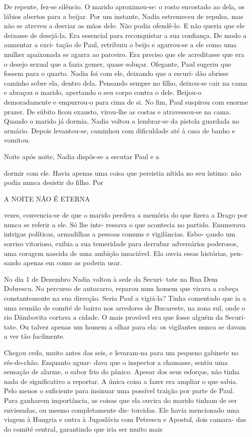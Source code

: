 De repente, fez‑se silêncio. O marido aproximou‑se: o rosto encostado ao
dela, os lábios abertos para a beijar. Por um instante, Nadia estremeceu
de repulsa, mas não se atreveu a desviar as mãos dele. Não podia
ofendê‑lo. E não queria que ele deixasse de desejá‑la. Era essencial
para reconquistar a sua confiança. De modo a aumentar a exci‑ tação de
Paul, retribuiu o beijo e agarrou‑se a ele como uma mulher apaixonada se
agarra ao parceiro. Era preciso que ele acreditasse que era o desejo
sexual que a fazia gemer, quase soluçar. Ofegante, Paul sugeriu que
fossem para o quarto. Nadia foi com ele, deixando que a escuri‑ dão
abrisse caminho sobre ela, dentro dela. Pensando sempre no filho,
deixou‑se cair na cama e abraçou o marido, apertando o seu corpo contra
o dele. Beijou‑o demoradamente e empurrou‑o para cima de si. No fim,
Paul suspirou com enorme prazer. De súbito ficou exausto, virou‑lhe as
costas e atravessou‑se na cama. Quando o marido já dormia, Nadia voltou
a lembrar‑se da pistola guardada no armário. Depois levantou‑se,
caminhou com dificuldade até à casa de banho e vomitou.

Noite após noite, Nadia dispôs‑se a escutar Paul e a

dormir com ele. Havia apenas uma coisa que persistia nítida no seu
íntimo: não podia nunca desistir do filho. Por

A NOITE NÃO É ETERNA

vezes, convencia‑se de que o marido perdera a memória do que fizera a
Drago por nunca se referir a ele. Só lhe inte‑ ressava o que acontecia
no partido. Enumerava intrigas políticas, armadilhas a pessoas comuns e
vigilâncias. Esbo‑ çando um sorriso vitorioso, exibia a sua temeridade
para derrubar adversários poderosos, uma coragem nascida de uma ambição
insaciável. Ela ouvia essas histórias, pen‑ sando apenas em como as
poderia usar.

No dia 1 de Dezembro Nadia voltou à sede da Securi‑ tate na Rua Dem
Dobrescu. No percurso de autocarro, reparou num homem que virava a
cabeça constantemente na sua direcção. Seria Paul a vigiá‑la? Tinha
comentado que ia a uma reunião de comité de bairro nos arredores de
Bucareste, na zona sul, onde o rio Dâmbovita cortava a cidade. O mais
provável era que fosse alguém da Securi‑ tate. Ou talvez apenas um homem
a olhar para ela: os vigilantes nunca se davam a ver tão facilmente.

Chegou cedo, muito antes das seis, e levaram‑na para um pequeno gabinete
no rés‑do‑chão. Enquanto aguar‑ dava que o inspector a chamasse, sentiu
uma sensação de alarme, o sabor frio do pânico. Apesar dos seus
esforços, não tinha nada de significativo a reportar. A única coisa a
fazer era ampliar o que sabia. Pelo menos o suficiente para insinuar uma
possível traição por parte de Paul. Para ganharem importância, as coisas
que ela ouvira do marido tinham de ser enviesadas, ou mesmo
completamente dis‑ torcidas. Ele havia mencionado uma viagem à Hungria e
outra à Jugoslávia com Petrescu e Apostol, dois camara‑ das do comité
central, garantindo que iria ser muito mais

